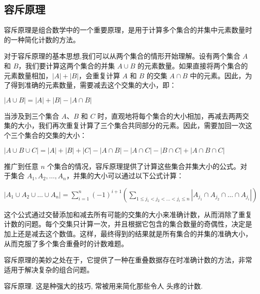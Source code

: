 
\subsection{容斥原理}

容斥原理是组合数学中的一个重要原理，是用于计算多个集合的并集中元素数量时的一种简化计数的方法。

对于容斥原理的基本思想,我们可以从两个集合的情形开始理解。设有两个集合 \(A\) 和 \(B\)，我们要计算这两个集合的并集 \(A \cup B\) 的元素数量。如果直接将两个集合的元素数量相加，\( |A| + |B| \)，会重复计算 \(A\) 和 \(B\) 的交集 \(A \cap B\) 中的元素。因此，为了得到准确的元素数量，需要减去这个交集的大小，即：

$|A \cup B| = |A| + |B| - |A \cap B|
$

当涉及到三个集合 \(A\)、\(B\) 和 \(C\) 时，直观地将每个集合的大小相加，再减去两两交集的大小，我们再次重复计算了三个集合共同部分的元素。因此，需要加回一次这个三个集合的交集的大小：

$
|A \cup B \cup C| = |A| + |B| + |C| - |A \cap B| - |A \cap C| - |B \cap C| + |A \cap B \cap C|
$

推广到任意 \(n\) 个集合的情况，容斥原理提供了计算这些集合并集大小的公式。对于集合 \(A_1, A_2, \ldots, A_n\)，并集的大小可以通过以下公式计算：

$
|A_1 \cup A_2 \cup \ldots \cup A_n| = \sum_{i=1}^{n} (-1)^{i+1} \left( \sum_{1 \leq j_1 < j_2 < \ldots < j_i \leq n} |A_{j_1} \cap A_{j_2} \cap \ldots \cap A_{j_i}| \right)
$

这个公式通过交替添加和减去所有可能的交集的大小来准确计数，从而消除了重复计数的问题。每个交集只计算一次，并且根据它包含的集合数量的奇偶性，决定是加上还是减去这个数值。这样，最终得到的结果就是所有集合的并集的准确大小，从而克服了多个集合重叠时的计数难题。

容斥原理的美妙之处在于，它提供了一种在重叠数据存在时准确计数的方法，非常适用于解决复杂的组合问题。





容斥原理. 这是种强大的技巧, 常被用来简化那些令人
头疼的计数.
